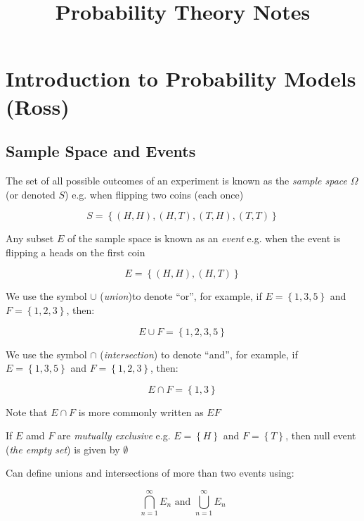\documentclass{article}
\title{Probability Theory Notes}
\begin{document}
\maketitle

\section{Introduction to Probability Models (Ross)}
\subsection{Sample Space and Events}

The set of all possible outcomes of an experiment is known as the 
\textit{sample space} $\Omega$ (or denoted $S$) e.g. when flipping two coins 
(each once)

\begin{equation}
    S = \left\{(H,H), (H,T), (T,H), (T,T)\right\}
\end{equation}

Any subset $E$ of the sample space is known as an \textit{event} e.g. when 
the event is flipping a heads on the first coin

\begin{equation}
    E = \left\{(H,H), (H,T)\right\}
\end{equation}

We use the symbol $\cup$ (\textit{union})to denote ``or'', for example, if 
$E = \left\{1,3,5\right\}$ and $F = \left\{1,2,3\right\}$, then:

\begin{equation}
    E \cup F = \left\{1, 2, 3, 5\right\}
\end{equation}

We use the symbol $\cap$ (\textit{intersection}) to denote ``and'', for example,
if $E = \left\{1,3,5\right\}$ and $F = \left\{1,2,3\right\}$, then:

\begin{equation}
    E \cap F = \left\{1, 3\right\}
\end{equation}

Note that $E \cap F$ is more commonly written as $EF$

If $E$ amd $F$ are \textit{mutually exclusive} e.g. $E = \left\{H\right\}$ and
$F = \left\{T\right\}$, then null event (\textit{the empty set}) is given by 
$\emptyset$

Can define unions and intersections of more than two events using:

\begin{equation}
    \bigcap_{n=1}^{\infty} E_n \text{ and }
    \bigcup_{n=1}^{\infty} E_n
\end{equation}
\end{document}
